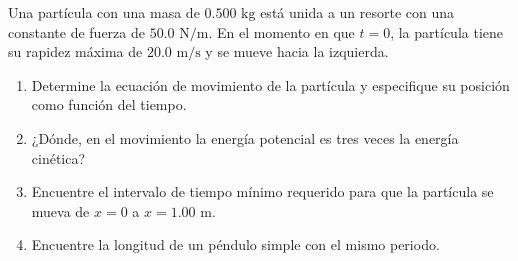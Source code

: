 \item Una partícula con una masa de $0.500\text{ kg}$ está unida a un resorte con una constante de fuerza de $50.0\text{ N/m}$. En el momento en que $t = 0$, la partícula tiene su rapidez máxima de $20.0\text{ m/s}$ y se mueve hacia la izquierda.
\begin{enumerate}
    \item Determine la ecuación de movimiento de la partícula y especifique su posición como función del tiempo.
    \item ¿Dónde, en el movimiento la energía potencial es tres veces la energía cinética?
    \item Encuentre el intervalo de tiempo mínimo requerido para que la partícula se mueva de $x = 0$ a $x = 1.00\text{ m}$.
    \item Encuentre la longitud de un péndulo simple con el mismo periodo.
\end{enumerate}